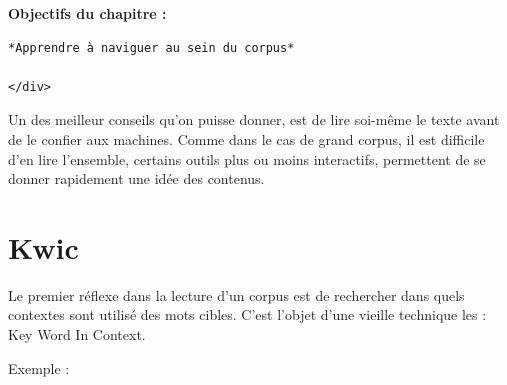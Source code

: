 \documentclass[
  letterpaper,
  DIV=11,
  numbers=noendperiod]{scrreprt}
\newenvironment{Shaded}{\begin{snugshade}}{\end{snugshade}}
\newcommand{\AttributeTok}[1]{\textcolor[rgb]{0.40,0.45,0.13}{#1}}
\newcommand{\DecValTok}[1]{\textcolor[rgb]{0.68,0.00,0.00}{#1}}
\newcommand{\FunctionTok}[1]{\textcolor[rgb]{0.28,0.35,0.67}{#1}}
\newcommand{\NormalTok}[1]{\textcolor[rgb]{0.00,0.23,0.31}{#1}}
\newcommand{\OtherTok}[1]{\textcolor[rgb]{0.00,0.23,0.31}{#1}}
\newcommand{\SpecialCharTok}[1]{\textcolor[rgb]{0.37,0.37,0.37}{#1}}
\newcommand{\StringTok}[1]{\textcolor[rgb]{0.13,0.47,0.30}{#1}}
\begin{document}
\textbf{Objectifs du chapitre :}

\begin{verbatim}
*Apprendre à naviguer au sein du corpus*

</div>
\end{verbatim}

Un des meilleur conseils qu'on puisse donner, est de lire soi-même le
texte avant de le confier aux machines. Comme dans le cas de grand
corpus, il est difficile d'en lire l'ensemble, certains outils plus ou
moins interactifs, permettent de se donner rapidement une idée des
contenus.

\section{Kwic}\label{kwic}

Le premier réflexe dans la lecture d'un corpus est de rechercher dans
quels contextes sont utilisé des mots cibles. C'est l'objet d'une
vieille technique les : Key Word In Context.

Exemple :

\begin{Shaded}
\end{Shaded}
\end{document}
